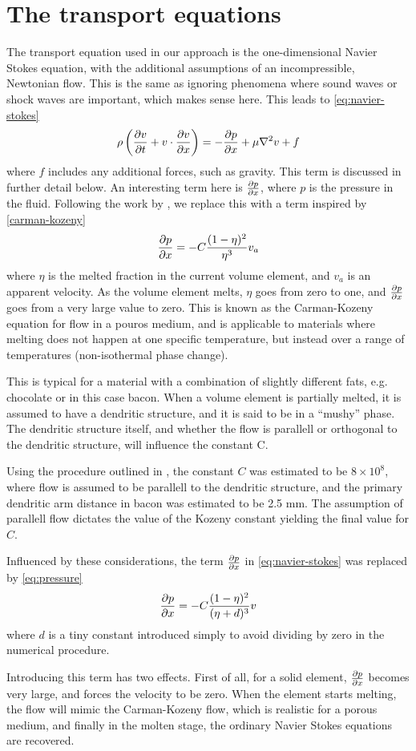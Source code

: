 \section{The transport equations}
The transport equation used in our approach is the one-dimensional Navier Stokes
equation, with the additional assumptions of an incompressible, Newtonian flow.
This is the same as ignoring phenomena where sound waves or shock waves are
important, which makes sense here. This leads to \cref{eq:navier-stokes}
\begin{equation}
  \rho \left(\frac{\partial v}{\partial t} + v \cdot \frac{\partial v}{\partial x}\right) = -\frac{\partial p}{\partial x} + \mu \nabla^2 v + f
 \label{eq:navier-stokes}
\end{equation}
where $f$ includes any additional forces, such as gravity. This term is
discussed in further detail below. An interesting term here is $\frac{\partial p}{\partial x}$, where
$p$ is the pressure in the fluid. Following the work by \cite{brent}, we replace
this with a term inspired by \cref{carman-kozeny}
\begin{equation}
  \frac{\partial p}{\partial x} = -C\frac{ (1-\eta)^2}{\eta^3} v_a
  \label{carman-kozeny}
\end{equation}
where $\eta$ is the melted fraction in the current volume element, and
$v_a$ is an apparent velocity. As the volume element melts, $\eta$ goes from
zero to one, and $\frac{\partial p}{\partial x}$ goes from a very large value to zero. This is known 
as the Carman-Kozeny equation for flow in a pouros medium, and is applicable to 
materials where melting does not happen at one specific temperature, but instead 
over a range of temperatures (non-isothermal phase change). \cite{poirier} 

This is typical for a material with a combination of slightly different
fats, e.g. chocolate or in this case bacon. When a volume element is partially
melted, it is assumed to have a dendritic structure, and it is said to be in a
``mushy'' phase. The dendritic structure itself, and whether the flow is parallell or
orthogonal to the dendritic structure, will influence the constant C. 

Using the procedure outlined in \cite{poirier}, the constant $C$ was estimated to be
$8 \times 10^8$, where flow is assumed to be parallell to the dendritic
structure, and the primary dendritic arm distance in bacon was estimated to be
2.5 mm. The assumption of parallell flow dictates the value of the Kozeny
constant yielding the final value for $C$.

Influenced by these considerations, the term $\frac{\partial p}{\partial x}$ in
\cref{eq:navier-stokes} was replaced by \cref{eq:pressure}
\begin{equation}
  \frac{\partial p}{\partial x} =  -C\frac{ (1-\eta)^2}{(\eta+d)^3} v
  \label{eq:pressure}
\end{equation}
where $d$ is a tiny constant introduced simply to avoid dividing by zero in the
numerical procedure.

Introducing this term has two effects. First of all, for a solid element,
$\frac{\partial p}{\partial x}$ becomes very large, and forces the velocity to be zero. When the
element starts melting, the flow will mimic the Carman-Kozeny flow, which is
realistic for a porous medium, and finally in the molten stage, the ordinary
Navier Stokes equations are recovered.



